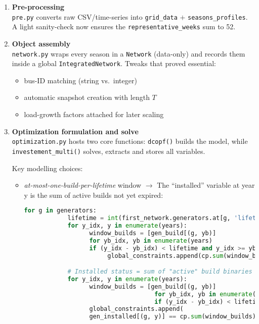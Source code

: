 \begin{enumerate}
      \item \textbf{Pre-processing}\\
            \texttt{pre.py} converts raw CSV/time-series into \texttt{grid\_data} \(+\) \texttt{seasons\_profiles}.  
            A light sanity-check now ensures the \texttt{representative\_weeks} sum to 52.

      \item \textbf{Object assembly}\\
            \texttt{network.py} wraps every season in a
            \texttt{Network} (data-only) and records them inside a
          global \texttt{IntegratedNetwork}.  Tweaks that proved
          essential:
          \begin{itemize}
              \item bus-ID matching (string vs.\ integer)
              \item automatic snapshot creation with length \(T\)
              \item load-growth factors attached for later scaling
          \end{itemize}

      \item \textbf{Optimization formulation and solve}\\
            \texttt{optimization.py} hosts two core functions:
            \texttt{dcopf()} builds the model, while
            \texttt{investement\_multi()} solves, extracts and stores all variables.

            Key modelling choices:
            \begin{itemize}
                \item \emph{at-most-one-build-per-lifetime} window  
                      \(\rightarrow\) The “installed” variable at year y is the sum of active builds not yet expired:
      \begin{lstlisting}[language=Python]
      for g in generators:
            lifetime = int(first_network.generators.at[g, 'lifetime_years'])
            for y_idx, y in enumerate(years):
                  window_builds = [gen_build[(g, yb)]
                  for yb_idx, yb in enumerate(years)
                  if (y_idx - yb_idx) < lifetime and y_idx >= yb_idx]
                       global_constraints.append(cp.sum(window_builds) <= 1)

            # Installed status = sum of "active" build binaries in
            for y_idx, y in enumerate(years):
                  window_builds = [gen_build[(g, yb)]
                                    for yb_idx, yb in enumerate(years)
                                    if (y_idx - yb_idx) < lifetime and y_idx >= yb_idx]
                  global_constraints.append(
                  gen_installed[(g, y)] == cp.sum(window_builds))


\end{lstlisting}
\end{itemize}
\end{enumerate}
